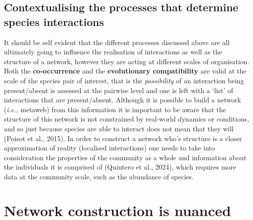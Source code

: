 \documentclass[
]{article}
\begin{document}
\subsection{Contextualising the processes that determine species
interactions}\label{contextualising-the-processes-that-determine-species-interactions}

It should be self evident that the different processes discussed above
are all ultimately going to influence the realisation of interactions as
well as the structure of a network, however they are acting at different
scales of organisation. Both the \textbf{co-occurrence} and the
\textbf{evolutionary compatibility} are valid at the scale of the
species pair of interest, that is the \emph{possibility} of an
interaction being present/absent is assessed at the pairwise level and
one is left with a `list' of interactions that are present/absent.
Although it is possible to build a network (\emph{i.e.,} metaweb) from
this information it is important to be aware that the structure of this
network is not constrained by real-world dynamics or conditions, and so
just because species are able to interact does not mean that they will
(Poisot et al., 2015). In order to construct a network who's structure
is a closer approximation of reality (localised interactions) one needs
to take into consideration the properties of the community as a whole
and information about the individuals it is comprised of (Quintero et
al., 2024), which requires more data at the community scale, such as the
abundance of species.

\section{Network construction is
nuanced}\label{network-construction-is-nuanced}
\end{document}
